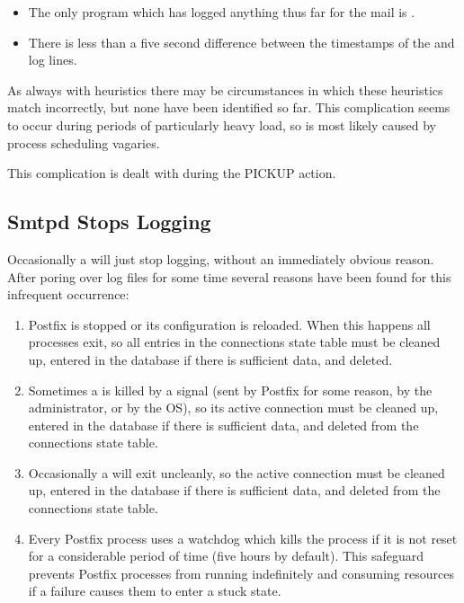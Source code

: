 \begin{itemize}

    \item The only program which has logged anything thus far for the mail
        is .

    \item There is less than a five second difference between the
        timestamps of the  and  log lines.

\end{itemize}

As always with heuristics there may be circumstances in which these
heuristics match incorrectly, but none have been identified so far.  This
complication seems to occur during periods of particularly heavy load, so
is most likely caused by process scheduling vagaries.

This complication is dealt with during the PICKUP action.

\subsection{Smtpd Stops Logging}

\label{smtpd stops logging}

Occasionally a  will just stop logging, without an
immediately obvious reason.  After poring over log files for some time
several reasons have been found for this infrequent occurrence:

\begin{enumerate}

    \item Postfix is stopped or its configuration is reloaded.  When this
        happens all  processes exit, so all entries in the
        connections state table must be cleaned up, entered in the database
        if there is sufficient data, and deleted.

    \item Sometimes a  is killed by a signal (sent by Postfix
        for some reason, by the administrator, or by the OS), so its active
        connection must be cleaned up, entered in the database if there is
        sufficient data, and deleted from the connections state table.

    \item Occasionally a  will exit uncleanly, so the active
        connection must be cleaned up, entered in the database if there is
        sufficient data, and deleted from the connections state table.

    \item Every Postfix process uses a watchdog which kills the process if
        it is not reset for a considerable period of time (five hours by
        default).  This safeguard prevents Postfix processes from running
        indefinitely and consuming resources if a failure causes them to
        enter a stuck state.

\end{enumerate}


